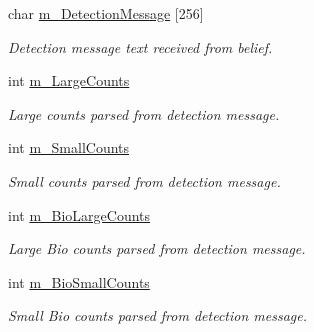 \begin{DoxyCompactItemize}
\item 
\hypertarget{class_particle_detection_belief_ae429dbb164c01e4805529217a38939fd}{
char \hyperlink{class_particle_detection_belief_ae429dbb164c01e4805529217a38939fd}{m\_\-DetectionMessage} \mbox{[}256\mbox{]}}
\label{class_particle_detection_belief_ae429dbb164c01e4805529217a38939fd}

\begin{DoxyCompactList}\small\item\em Detection message text received from belief. \end{DoxyCompactList}\item 
\hypertarget{class_particle_detection_belief_a2f1b91e8e12c3da1235eda7287dc2ebc}{
int \hyperlink{class_particle_detection_belief_a2f1b91e8e12c3da1235eda7287dc2ebc}{m\_\-LargeCounts}}
\label{class_particle_detection_belief_a2f1b91e8e12c3da1235eda7287dc2ebc}

\begin{DoxyCompactList}\small\item\em Large counts parsed from detection message. \end{DoxyCompactList}\item 
\hypertarget{class_particle_detection_belief_aae60587ae6fe72421da7c492045bcf7e}{
int \hyperlink{class_particle_detection_belief_aae60587ae6fe72421da7c492045bcf7e}{m\_\-SmallCounts}}
\label{class_particle_detection_belief_aae60587ae6fe72421da7c492045bcf7e}

\begin{DoxyCompactList}\small\item\em Small counts parsed from detection message. \end{DoxyCompactList}\item 
\hypertarget{class_particle_detection_belief_a81ea65758f0f94af50c4ae3e07a44dfa}{
int \hyperlink{class_particle_detection_belief_a81ea65758f0f94af50c4ae3e07a44dfa}{m\_\-BioLargeCounts}}
\label{class_particle_detection_belief_a81ea65758f0f94af50c4ae3e07a44dfa}

\begin{DoxyCompactList}\small\item\em Large Bio counts parsed from detection message. \end{DoxyCompactList}\item 
\hypertarget{class_particle_detection_belief_a1cfb75d332057f1737a41345fcf814c7}{
int \hyperlink{class_particle_detection_belief_a1cfb75d332057f1737a41345fcf814c7}{m\_\-BioSmallCounts}}
\label{class_particle_detection_belief_a1cfb75d332057f1737a41345fcf814c7}

\begin{DoxyCompactList}\small\item\em Small Bio counts parsed from detection message. \end{DoxyCompactList}\end{DoxyCompactItemize}


